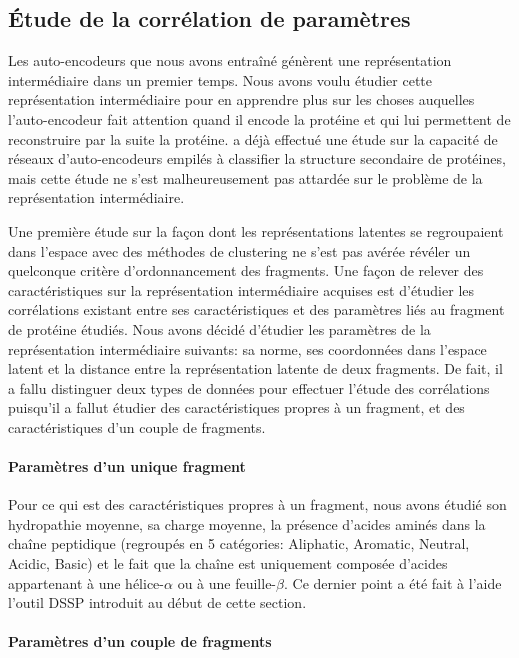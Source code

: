 \documentclass[a4paper, 11pt, onecolumn]{article}
\begin{document}
\subsection{Étude de la corrélation de paramètres}

Les auto-encodeurs que nous avons entraîné génèrent une représentation intermédiaire dans un premier
temps. Nous avons voulu étudier cette représentation intermédiaire pour en
apprendre plus sur les choses auquelles l'auto-encodeur fait attention quand il
encode la protéine et qui lui permettent de reconstruire par la suite la
protéine. \cite{jian2013predicting} a déjà effectué une étude sur la capacité de réseaux d'auto-encodeurs
empilés à classifier la structure secondaire de protéines, mais cette étude ne
s'est malheureusement pas attardée sur le problème de la représentation
intermédiaire.

Une première étude sur la façon dont les représentations latentes se
regroupaient dans l'espace avec des méthodes de clustering ne s'est pas avérée
révéler un quelconque critère d'ordonnancement des fragments. 
Une façon de relever des caractéristiques sur la représentation
intermédiaire acquises est d'étudier les corrélations existant entre ses
caractéristiques et des paramètres liés au fragment de protéine étudiés. Nous
avons décidé d'étudier les paramètres de la représentation intermédiaire
suivants: sa norme, ses coordonnées dans l'espace latent et la distance entre la
représentation latente de deux fragments. De fait, il a fallu distinguer deux
types de données pour effectuer l'étude des corrélations puisqu'il a fallut
étudier des caractéristiques propres à un fragment, et des caractéristiques
d'un couple de fragments.

\paragraph{Paramètres d'un unique fragment}

Pour ce qui est des caractéristiques propres à un fragment, nous avons étudié
son hydropathie moyenne, sa charge moyenne, la présence d'acides aminés dans la
chaîne peptidique (regroupés en 5 catégories: Aliphatic, Aromatic, Neutral,
Acidic, Basic) et le fait que la chaîne est uniquement composée d'acides appartenant à
une hélice-$\alpha$ ou à une feuille-$\beta$. Ce dernier point a été fait à
l'aide l'outil DSSP introduit au début de cette section.

\paragraph{Paramètres d'un couple de fragments}
\end{document}
